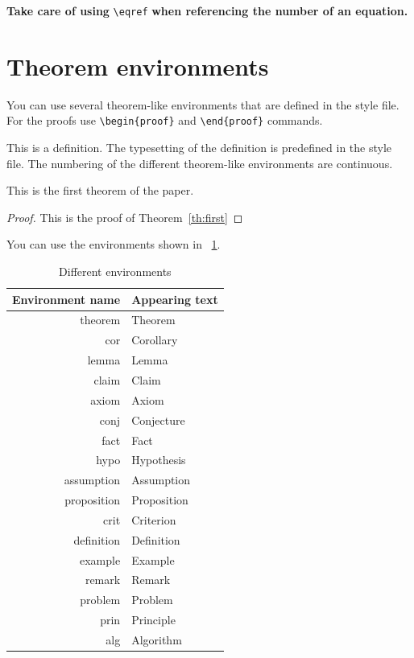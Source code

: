 \documentclass[twoside,b5paper,10pt]{article}
\begin{document}
\textbf{Take care of using} \verb|\eqref| \textbf{when referencing the number of an equation.}

\section{Theorem environments}
\label{sec:theorem}

 You can use several theorem-like environments
that are defined in the style file. For the proofs use
\verb|\begin{proof}| and \verb|\end{proof}| commands.

\begin{definition}
This is a definition. The typesetting of the definition is
predefined in the style file. The numbering of the different
theorem-like environments are continuous.
\end{definition}


\begin{theorem}
\label{th:first} This is the first theorem of the paper.
\end{theorem}

\begin{proof}
This is the proof of Theorem~\ref{th:first}
\end{proof}


You can use the environments shown in \tablename~\ref{tab:env}.

\begin{table}[htb]
\caption{Different environments}
\label{tab:env}
\begin{center}
\begin{tabular}{|r | l|}
 \hline
 Environment name & Appearing text \\
 \hline
 theorem & Theorem \\
 cor & Corollary \\
 lemma & Lemma \\
 claim & Claim \\
 axiom & Axiom \\
 conj & Conjecture \\
 fact & Fact \\
 hypo & Hypothesis \\
 assumption & Assumption \\
 proposition & Proposition \\
 crit & Criterion \\
 definition & Definition \\
 example & Example \\
 remark & Remark \\
 problem & Problem \\
 prin & Principle \\
 alg & Algorithm \\
\hline
\end{tabular}
\end{center}
\end{table}
\end{document}
